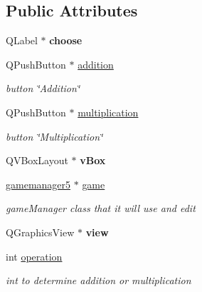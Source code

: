 \subsection*{\-Public \-Attributes}
\begin{DoxyCompactItemize}
\item 
\hypertarget{classmainmenu_aefa862e24332067075959a0f1097822a}{\-Q\-Label $\ast$ {\bfseries choose}}\label{classmainmenu_aefa862e24332067075959a0f1097822a}

\item 
\hypertarget{classmainmenu_aaefd3607900bba8c92ee9a3529dbf37b}{\-Q\-Push\-Button $\ast$ \hyperlink{classmainmenu_aaefd3607900bba8c92ee9a3529dbf37b}{addition}}\label{classmainmenu_aaefd3607900bba8c92ee9a3529dbf37b}

\begin{DoxyCompactList}\small\item\em button \char`\"{}\-Addition\char`\"{} \end{DoxyCompactList}\item 
\hypertarget{classmainmenu_aa227f55b300e88fef1eb05eff8f0b632}{\-Q\-Push\-Button $\ast$ \hyperlink{classmainmenu_aa227f55b300e88fef1eb05eff8f0b632}{multiplication}}\label{classmainmenu_aa227f55b300e88fef1eb05eff8f0b632}

\begin{DoxyCompactList}\small\item\em button \char`\"{}\-Multiplication\char`\"{} \end{DoxyCompactList}\item 
\hypertarget{classmainmenu_ade17cd29fd45c9ab3f7bf5cc6f0ca8d9}{\-Q\-V\-Box\-Layout $\ast$ {\bfseries v\-Box}}\label{classmainmenu_ade17cd29fd45c9ab3f7bf5cc6f0ca8d9}

\item 
\hypertarget{classmainmenu_a27cdd4d8a9fb0d5bceca1095c9cfccd3}{\hyperlink{classgamemanager5}{gamemanager5} $\ast$ \hyperlink{classmainmenu_a27cdd4d8a9fb0d5bceca1095c9cfccd3}{game}}\label{classmainmenu_a27cdd4d8a9fb0d5bceca1095c9cfccd3}

\begin{DoxyCompactList}\small\item\em game\-Manager class that it will use and edit \end{DoxyCompactList}\item 
\hypertarget{classmainmenu_a8fed79207e40ebc17a42d8d11dfdcfa8}{\-Q\-Graphics\-View $\ast$ {\bfseries view}}\label{classmainmenu_a8fed79207e40ebc17a42d8d11dfdcfa8}

\item 
\hypertarget{classmainmenu_afad9dee09a511f0032d653d51008662b}{int \hyperlink{classmainmenu_afad9dee09a511f0032d653d51008662b}{operation}}\label{classmainmenu_afad9dee09a511f0032d653d51008662b}

\begin{DoxyCompactList}\small\item\em int to determine addition or multiplication \end{DoxyCompactList}\end{DoxyCompactItemize}


